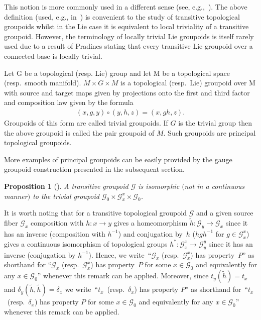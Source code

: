 \documentclass[11pt]{article}
\newtheorem{prop}[tw]{Proposition}
\begin{document}
\begin{rem} This notion is more commonly used in a different sense (see, e.g.,~\cite{R}). The above definition (used, e.g., in~\cite{McK1}) is convenient to the study of transitive topological groupoids whilst in the Lie case it is equivalent to local triviality of a transitive groupoid. However, the terminology of locally trivial Lie groupoids is itself rarely used due to a result of Pradines stating that every transitive Lie groupoid over a connected base is locally trivial.
\end{rem}
\begin{egg}Let G be a topological (resp. Lie) group and let M be a topological space (resp.\ smooth manifold). $M\times G\times M$ is a topological (resp.\ Lie) groupoid over M with source and target maps given by projections onto the first and third factor and composition law given by the formula
\begin{gather*}
(x,g,y)\circ (y,h,z)=(x,gh,z).
\end{gather*}
Groupoids of this form are called trivial groupoids. If $G$ is the trivial group then the above groupoid is called the pair groupoid of $M$. Such groupoids are principal topological groupoids.
\end{egg}
More examples of principal groupoids can be easily provided by the gauge groupoid construction presented in the subsequent section.
\begin{prop}[{\cite[Proposition 3.2]{McK1}}] A transitive groupoid $\mathcal{G}$ is isomorphic $($not in a continuous manner$)$ to the trivial groupoid $\mathcal{G}_0\times\mathcal{G}^x_x\times\mathcal{G}_0$.
\end{prop}

\begin{rem} It is worth noting that for a transitive topological groupoid $\mathcal{G}$ and a given source fiber $\mathcal{G}_x$ composition with $h\colon x\rightarrow y$ gives a homeomorphism $\tilde{h}\colon \mathcal{G}_y\rightarrow \mathcal{G}_x$ since it has an inverse (composition with $h^{-1}$) and conjugation by~$h$ ($hgh^{-1}$ for $g\in\mathcal{G}_x^x$) gives a continuous isomorphism of topological groups $h^*\colon \mathcal{G}^x_x\rightarrow \mathcal{G}^y_y$ since it has an inverse (conjugation by $h^{-1}$). Hence, we write~``$\mathcal{G}_x$ (resp.~$\mathcal{G}_x^x$) has property~$P$'' as shorthand for ``$\mathcal{G}_x$ (resp.\ $\mathcal{G}^x_x$) has property~$P$ for some $x\in\mathcal{G}_0$ and equivalently for any $x\in\mathcal{G}_0$'' whenever this remark can be applied. Moreover, since $t_y(\tilde{h})=t_x$ and $\delta_y(\tilde{h},\tilde{h})=\delta_x$ we write~``$t_x$~(resp.~$\delta_x$) has property $P$'' as shorthand for~``$t_x$~(resp.~$\delta_x$) has property $P$ for some $x\in\mathcal{G}_0$ and equivalently for any $x\in\mathcal{G}_0$'' whenever this remark can be applied.
\end{rem}
\end{document}
